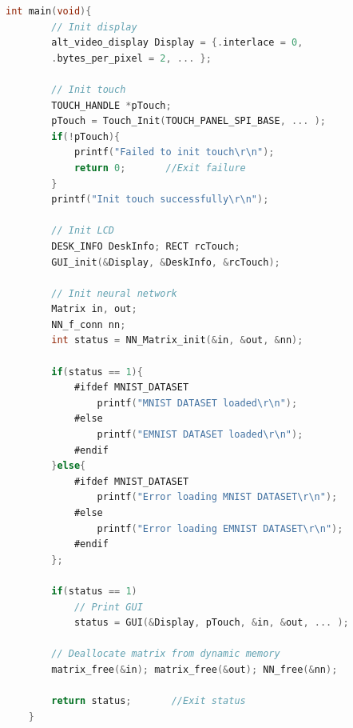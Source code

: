 \newpage
\begin{lstlisting}[language=C, caption={Main}, label={lst:main}, morekeywords={NN_f_conn,Matrix,\#include,\#define,\#ifdef,\#ifndef,\#else,\#endif}, alsoletter={\#}]
    int main(void){  
        // Init display
        alt_video_display Display = {.interlace = 0, 
        .bytes_per_pixel = 2, ... };
        
        // Init touch
        TOUCH_HANDLE *pTouch;
        pTouch = Touch_Init(TOUCH_PANEL_SPI_BASE, ... );
        if(!pTouch){
            printf("Failed to init touch\r\n");
            return 0;       //Exit failure
        }        
        printf("Init touch successfully\r\n");
        
        // Init LCD
        DESK_INFO DeskInfo; RECT rcTouch;
        GUI_init(&Display, &DeskInfo, &rcTouch);
        
        // Init neural network
        Matrix in, out;
        NN_f_conn nn;
        int status = NN_Matrix_init(&in, &out, &nn);
        
        if(status == 1){
            #ifdef MNIST_DATASET
                printf("MNIST DATASET loaded\r\n");
            #else
                printf("EMNIST DATASET loaded\r\n");
            #endif
        }else{
            #ifdef MNIST_DATASET
                printf("Error loading MNIST DATASET\r\n");
            #else
                printf("Error loading EMNIST DATASET\r\n");
            #endif
        };
        
        if(status == 1)
            // Print GUI
            status = GUI(&Display, pTouch, &in, &out, ... );
        
        // Deallocate matrix from dynamic memory
        matrix_free(&in); matrix_free(&out); NN_free(&nn);
        
        return status;       //Exit status
    }
    
\end{lstlisting}